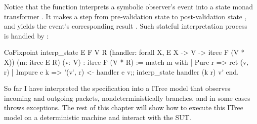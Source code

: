 Notice that the  function interprets a symbolic observer's event
 into a state monad transformer .  It
makes a step from pre-validation state  to post-validation state
, and yields the event's corresponding result .  Such
stateful interpretation process is handled by :
\begin{coq}
  CoFixpoint interp_state {E F V R}
                          (handler: forall {X}, E X -> V -> itree F (V * X))
                          (m: itree E R) (v: V)
             : itree F (V * R) :=
    match m with
    | Pure   r   => ret (v, r)
    | Impure e k => '(v', r) <- handler e v;;
                    interp_state handler (k r) v'
    end.
\end{coq}

So far I have interpreted the specification into a ITree model that observes
incoming and outgoing packets, nondeterministically branches, and in some cases
throws exceptions.  The rest of this chapter will show how to execute this ITree
model on a deterministic machine and interact with the SUT.
